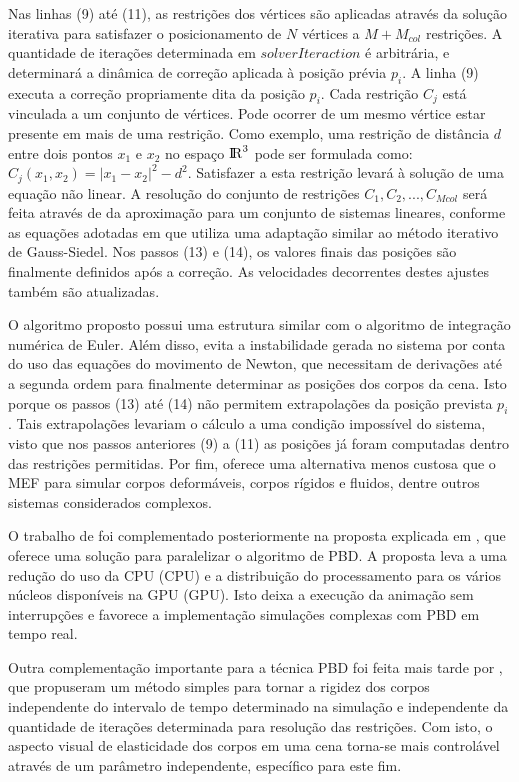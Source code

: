 Nas linhas (9) até (11), as restrições dos vértices são aplicadas através da solução iterativa para satisfazer o posicionamento de $N$ vértices a $M+M_{col}$ restrições. A quantidade de iterações determinada em $solverIteraction$ é arbitrária, e determinará a dinâmica de correção aplicada à posição prévia $p_i$.
A linha (9) executa a correção propriamente dita da posição $p_i$. Cada restrição $C_j$ está vinculada a um conjunto de vértices. Pode ocorrer de um mesmo vértice estar presente em mais de uma restrição. Como exemplo, uma restrição de distância $d$ entre dois pontos $x_1$ e $x_2$ no espaço ${\rm I\!R}^3$ pode ser formulada como: $C_j(x_1, x_2) = |x_1 - x_2|^2 - d^2$. Satisfazer a esta restrição levará à solução de uma equação não linear. A resolução do conjunto de restrições ${C_1, C_2, ..., C_{Mcol}}$ será feita através de da aproximação para um conjunto de sistemas lineares, conforme as equações adotadas em \cite{muller2007position} que utiliza uma adaptação similar ao método iterativo de Gauss-Siedel. Nos passos (13) e (14), os valores finais das posições são finalmente definidos após a correção. As velocidades decorrentes destes ajustes também são atualizadas.

O algoritmo proposto possui uma estrutura similar com o algoritmo de integração numérica de Euler. Além disso, evita a instabilidade gerada no sistema por conta do uso das equações do movimento de Newton, que necessitam de derivações até a segunda ordem para finalmente determinar as posições dos corpos da cena. Isto porque os passos (13) até (14) não permitem extrapolações da posição prevista $p_i$. Tais extrapolações levariam o cálculo a uma condição impossível do sistema, visto que nos passos anteriores (9) a (11) as posições já foram computadas dentro das restrições permitidas. Por fim, oferece uma alternativa menos custosa que o \acs{MEF} para simular corpos deformáveis, corpos rígidos e fluidos, dentre outros sistemas considerados complexos.

O trabalho de \cite{muller2007position} foi complementado posteriormente na proposta explicada em \cite{fratarcangeli2013gpu}, que oferece uma solução para paralelizar o algoritmo de \ac{PBD}. A proposta leva a uma redução do uso da \acs{CPU} (\acl{CPU}) e a distribuição do processamento para os vários núcleos disponíveis na \acs{GPU} (\acl{GPU}). Isto deixa a execução da animação sem interrupções e favorece a implementação simulações complexas com \acs{PBD} em tempo real.

Outra complementação importante para a técnica \acs{PBD} foi feita mais tarde por \cite{macklin2016xpbd}, que propuseram um método simples para tornar a rigidez dos corpos independente do intervalo de tempo determinado na simulação e independente da quantidade de iterações determinada para resolução das restrições. Com isto, o aspecto visual de elasticidade dos corpos em uma cena torna-se mais controlável através de um parâmetro independente, específico para este fim.


